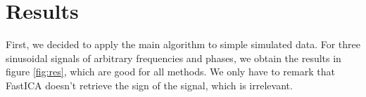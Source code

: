\documentclass[a4paper]{article}
\begin{document}
\section{Results}
First, we decided to apply the main algorithm to simple simulated data.
For three sinusoidal signals of arbitrary frequencies and phases, we obtain the results in figure \ref{fig:res}, which are good for all methods. We only have to remark that FastICA doesn't retrieve the sign of the signal, which is irrelevant.


\end{document}
